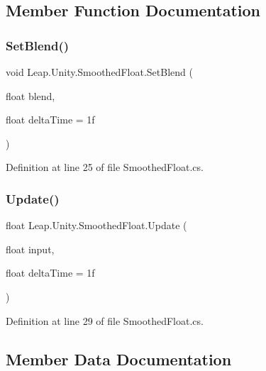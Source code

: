 \subsection{Member Function Documentation}
\mbox{\label{class_leap_1_1_unity_1_1_smoothed_float_a2c8704ac663800cb27c38cc6377bba06}} 
\subsubsection{\texorpdfstring{SetBlend()}{SetBlend()}}
{\footnotesize\ttfamily void Leap.\+Unity.\+Smoothed\+Float.\+Set\+Blend (\begin{DoxyParamCaption}\item[{float}]{blend,  }\item[{float}]{delta\+Time = {\ttfamily 1f} }\end{DoxyParamCaption})}



Definition at line 25 of file Smoothed\+Float.\+cs.

\mbox{\label{class_leap_1_1_unity_1_1_smoothed_float_ad83fc14468793a846eb227919002fed0}} 
\subsubsection{\texorpdfstring{Update()}{Update()}}
{\footnotesize\ttfamily float Leap.\+Unity.\+Smoothed\+Float.\+Update (\begin{DoxyParamCaption}\item[{float}]{input,  }\item[{float}]{delta\+Time = {\ttfamily 1f} }\end{DoxyParamCaption})}



Definition at line 29 of file Smoothed\+Float.\+cs.



\subsection{Member Data Documentation}
\mbox{\label{class_leap_1_1_unity_1_1_smoothed_float_a5cd6d4133c91fa19fd4599f446f3d7f5}} 
